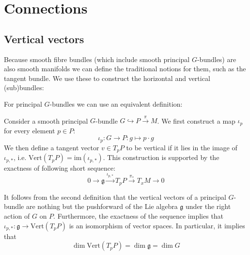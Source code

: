 \section{Connections}
\subsection{Vertical vectors}
	
	Because smooth fibre bundles (which include smooth principal $G$-bundles) are also smooth manifolds we can define the traditional notions for them, such as the tangent bundle. We use these to construct the horizontal and vertical (sub)bundles:

	For principal $G$-bundles we can use an equivalent definition:
	\begin{adefinition}
		Consider a smooth principal $G$-bundle $G\hookrightarrow P\xrightarrow{\pi} M$. We first construct a map $\iota_p$ for every element $p\in P$:
		\begin{equation}
			\iota_p:G\rightarrow P: g\mapsto p\cdot g
		\end{equation}
		We then define a tangent vector $v\in T_p P$ to be vertical if it lies in the image of $\iota_{p,\ast}$, i.e. $\text{Vert}(T_pP) = \text{im}(\iota_{p,\ast})$. This construction is supported by the exactness of following short sequence:
		\begin{equation}
			0\xrightarrow{} \mathfrak{g} \xrightarrow{\iota_{p,\ast}} T_p P\xrightarrow{\pi_\ast} T_xM \xrightarrow{} 0
		\end{equation}
	\end{adefinition}
	
	\begin{property}[Dimension]
		It follows from the second definition that the vertical vectors of a principal $G$-bundle are nothing but the pushforward of the Lie algebra $\mathfrak{g}$ under the right action of $G$ on $P$. Furthermore, the exactness of the sequence implies that $\iota_{p,\ast}:\mathfrak{g}\rightarrow\text{Vert}(T_pP)$ is an isomorphism of vector spaces. In particular, it implies that
		\begin{equation}
			\label{manifolds:vertical_dimension}
			\dim\text{Vert}(T_pP) = \dim\mathfrak{g} = \dim G
		\end{equation}
	\end{property}
	
